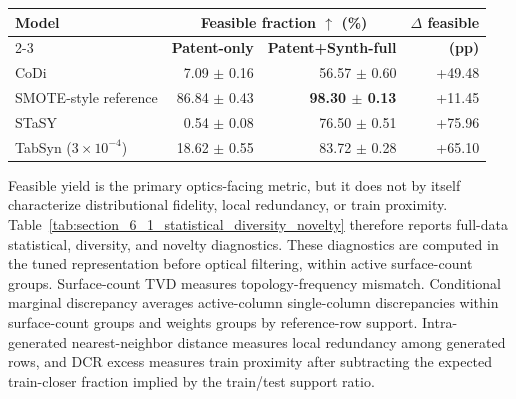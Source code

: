 \begin{center}
\begin{minipage}{0.98\linewidth}
\centering
\footnotesize
{}
\label{tab:section_6_1_synthetic_expansion_summary}
\begin{tabular}{lrrr}
\toprule
\textbf{Model} & \multicolumn{2}{c}{\textbf{Feasible fraction $\uparrow$ (\%)}} & \textbf{$\Delta$ feasible} \\
\cmidrule(lr){2-3}
 & \textbf{Patent-only} & \textbf{Patent+Synth-full} & \textbf{(pp)} \\
\midrule
CoDi & 7.09 \ensuremath{\pm} 0.16 & 56.57 \ensuremath{\pm} 0.60 & +49.48 \\
SMOTE-style reference & 86.84 \ensuremath{\pm} 0.43 & \textbf{98.30 \ensuremath{\pm} 0.13} & +11.45 \\
STaSY & 0.54 \ensuremath{\pm} 0.08 & 76.50 \ensuremath{\pm} 0.51 & +75.96 \\
TabSyn ($3\times10^{-4}$) & 18.62 \ensuremath{\pm} 0.55 & 83.72 \ensuremath{\pm} 0.28 & +65.10 \\
\bottomrule
\end{tabular}
\end{minipage}
\end{center}

Feasible yield is the primary optics-facing metric, but it does not by itself characterize distributional fidelity, local redundancy, or train proximity. Table~\ref{tab:section_6_1_statistical_diversity_novelty} therefore reports full-data statistical, diversity, and novelty diagnostics. These diagnostics are computed in the tuned representation before optical filtering, within active surface-count groups. Surface-count TVD measures topology-frequency mismatch. Conditional marginal discrepancy averages active-column single-column discrepancies within surface-count groups and weights groups by reference-row support. Intra-generated nearest-neighbor distance measures local redundancy among generated rows, and DCR excess measures train proximity after subtracting the expected train-closer fraction implied by the train/test support ratio.

